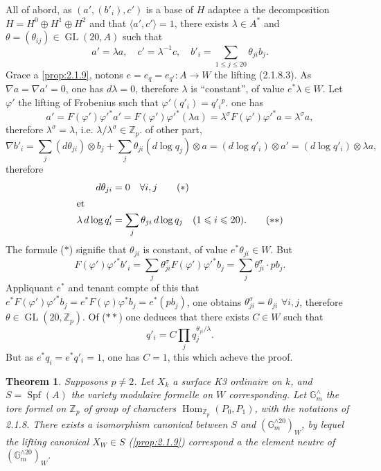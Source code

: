 \documentclass[12pt,a4paper]{article}
\theoremstyle{plain}
\newtheorem{theorem}{Theorem}[section]
\theoremstyle{definition}
\theoremstyle{remark}
\DeclareMathOperator{\Hom}{Hom}
\DeclareMathOperator{\Spf}{Spf}
\providecommand{\Hom}{\operatorname{Hom}}
\providecommand{\GL}{\operatorname{GL}}
\begin{document}
All of abord, as $(a', (b'_i), c')$ is a base of $H$ adaptee a the decomposition $H = H^0 \oplus H^1 \oplus H^2$ and that $\langle a', c' \rangle = 1$, there exists $\lambda \in A^*$ and $\theta = (\theta_{ij}) \in \GL(20, A)$ such that
\[
a' = \lambda a, \quad c' = \lambda^{-1} c, \quad b'_i = \sum_{1\leqslant j\leqslant 20} \theta_{ji} b_j.
\]
Grace a \ref{prop:2.1.9}, notons $e = e_q = e_{q'} : A \to W$ the lifting (2.1.8.3). As $\nabla a = \nabla a' = 0$, one has $d\lambda = 0$, therefore $\lambda$ is ``constant'', of value $e^*\lambda \in W$. Let $\varphi'$ the lifting of Frobenius such that $\varphi'(q'_i) = q'_i{}^p$. one has
\[
a' = F(\varphi')\varphi'^* a' = F(\varphi')\varphi'^*(\lambda a) = \lambda^\sigma F(\varphi')\varphi'^* a = \lambda^\sigma a,
\]
therefore $\lambda^\sigma = \lambda$, i.e. $\lambda/\lambda^\sigma \in \mathbb{Z}_p$. of other part,
\[
\nabla b'_i = \sum_j (d\theta_{ji}) \otimes b_j + \sum_j \theta_{ji}(d\log q_j) \otimes a = (d\log q'_i) \otimes a' = (d\log q'_i) \otimes \lambda a,
\]
therefore
\begin{align*}
d\theta_{ji} &= 0 \quad \forall i, j \tag{$\ast$} \\
\intertext{et}
\lambda \, d\log q'_i &= \sum_j \theta_{ji} \, d\log q_j \quad (1 \leqslant i \leqslant 20). \tag{$\ast\ast$}
\end{align*}
The formule ($\ast$) signifie that $\theta_{ji}$ is constant, of value $e^*\theta_{ji} \in W$. But
\[
F(\varphi')\varphi'^* b'_i = \sum_j \theta_{ji}^\sigma F(\varphi')\varphi'^* b_j = \sum_j \theta_{ji}^\sigma \cdot pb_j.
\]
Appliquant $e^*$ and tenant compte of this that $e^*F(\varphi')\varphi'^* b_j = e^*F(\varphi)\varphi^* b_j = e^*(pb_j)$, one obtains $\theta_{ji}^\sigma = \theta_{ji}$ $\forall i, j$, therefore $\theta \in \GL(20, \mathbb{Z}_p)$. Of ($\ast\ast$) one deduces that there exists $C \in W$ such that
\[
q'_i = C \prod_j q_j^{\theta_{ji}/\lambda}.
\]
But as $e^* q_i = e^* q'_i = 1$, one has $C = 1$, this which acheve the proof.

\begin{theorem}\label{thm:2.1.14}
Supposons $p \neq 2$. Let $X_k$ a surface K3 ordinaire on $k$, and $S = \Spf(A)$ the variety modulaire formelle on $W$ corresponding. Let $\mathbb{G}_m^{\wedge}$ the tore formel on $\mathbb{Z}_p$ of group of characters $\Hom_{\mathbb{Z}_p}(P_0, P_1)$, with the notations of 2.1.8. There exists a isomorphism canonical between $S$ and $(\mathbb{G}_m^{\wedge 20})_W$, by lequel the lifting canonical $X_W \in S$ (\ref{prop:2.1.9}) correspond a the element neutre of $(\mathbb{G}_m^{\wedge 20})_W$.
\end{theorem}
\end{document}

